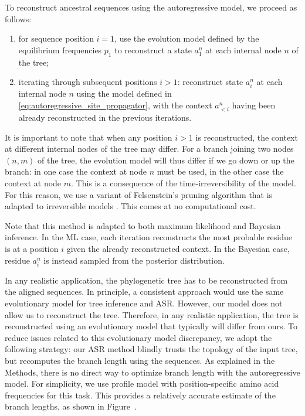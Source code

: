 To reconstruct ancestral sequences using the autoregressive model, we proceed as follows: 
\begin{enumerate}[label=\emph{(\roman*)}]	
	\item for sequence position $i=1$, use the evolution model defined by the equilibrium frequencies $p_1$ to reconstruct a state $a^n_1$ at each internal node $n$ of the tree;
	\item iterating through subsequent positions $i > 1$: reconstruct state $a^n_i$ at each internal node $n$ using the model defined in \eqref{eq:autoregressive_site_propagator}, with the context $a^n_{<i}$ having been already reconstructed in the previous iterations. 
\end{enumerate}
It is important to note that when any position $i>1$ is reconstructed, the context at different internal nodes of the tree may differ. 
For a branch joining two nodes $(n, m)$ of the tree, the evolution model will thus differ if we go down or up the branch: in one case the context at node $n$ must be used, in the other case the context at node $m$. 
This is a consequence of the time-irreversibility of the model. 
For this reason, we use a variant of Felsenstein's pruning algorithm that is adapted to irreversible models \cite{boussau_efficientlikelihoodcomputations_2006}. 
This comes at no computational cost. 

Note that this method is adapted to both maximum likelihood and Bayesian inference. 
In the ML case, each iteration reconstructs the most probable residue is at a position $i$ given the already reconstructed context. 
In the Bayesian case, residue $a^n_i$ is instead sampled from the posterior distribution. 

In any realistic application, the phylogenetic tree has to be reconstructed from the aligned sequences. 
In principle, a consistent approach would use the same evolutionary model for tree inference and ASR. 
However, our model does not allow us to reconstruct the tree.
Therefore, in any realistic application, the tree is reconstructed using an evolutionary model that typically will differ from ours. 
To reduce issues related to this evolutionary model discrepancy, we adopt the following strategy: our ASR method blindly trusts the topology of the input tree, but recomputes the branch length using the sequences. 
As explained in the Methods, there is no direct way to optimize branch length with the autoregressive model. 
For simplicity, we use profile model with position-specific amino acid frequencies for this task. 
This provides a relatively accurate estimate of the branch lengths, as shown in Figure~.


